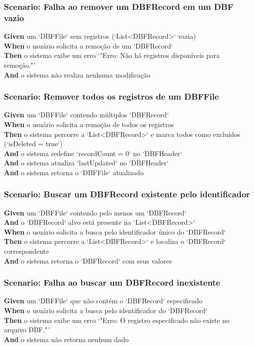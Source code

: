 \subsubsection{Scenario: Falha ao remover um DBFRecord em um DBF vazio}
\textbf{Given} um `DBFFile` sem registros (`List<DBFRecord>` vazia) \\
\textbf{When} o usuário solicita a remoção de um `DBFRecord` \\
\textbf{Then} o sistema exibe um erro `"Erro: Não há registros disponíveis para remoção."` \\
\textbf{And} o sistema não realiza nenhuma modificação

\subsubsection{Scenario: Remover todos os registros de um DBFFile}
\textbf{Given} um `DBFFile` contendo múltiplos `DBFRecord` \\
\textbf{When} o usuário solicita a remoção de todos os registros \\
\textbf{Then} o sistema percorre a `List<DBFRecord>` e marca todos como excluídos (`isDeleted = true`) \\
\textbf{And} o sistema redefine `recordCount = 0` no `DBFHeader` \\
\textbf{And} o sistema atualiza `lastUpdated` no `DBFHeader` \\
\textbf{And} o sistema retorna o `DBFFile` atualizado

\subsubsection{Scenario: Buscar um DBFRecord existente pelo identificador}
\textbf{Given} um `DBFFile` contendo pelo menos um `DBFRecord` \\
\textbf{And} o `DBFRecord` alvo está presente na `List<DBFRecord>` \\
\textbf{When} o usuário solicita a busca pelo identificador único do `DBFRecord` \\
\textbf{Then} o sistema percorre a `List<DBFRecord>` e localiza o `DBFRecord` correspondente \\
\textbf{And} o sistema retorna o `DBFRecord` com seus valores

\subsubsection{Scenario: Falha ao buscar um DBFRecord inexistente}
\textbf{Given} um `DBFFile` que não contém o `DBFRecord` especificado \\
\textbf{When} o usuário solicita a busca pelo identificador do `DBFRecord` \\
\textbf{Then} o sistema exibe um erro `"Erro: O registro especificado não existe no arquivo DBF."` \\
\textbf{And} o sistema não retorna nenhum dado

